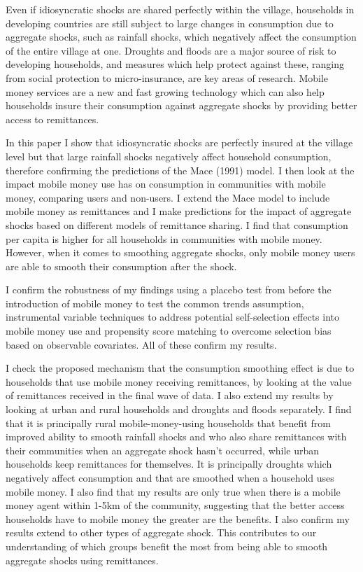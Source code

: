 Even if idiosyncratic shocks are shared perfectly within the village, households in developing countries are still subject to large changes in consumption due to aggregate shocks, such as rainfall shocks, which negatively affect the consumption of the entire village at one. Droughts and floods are a major source of risk to developing households, and measures which help protect against these, ranging from social protection to micro-insurance, are key areas of research. Mobile money services are a new and fast growing technology which can also help households insure their consumption against aggregate shocks by providing better access to remittances.

In this paper I show that idiosyncratic shocks are perfectly insured at the village level but that large rainfall shocks negatively affect household consumption, therefore confirming the predictions of the Mace (1991) model. I then look at the impact mobile money use has on consumption in communities with mobile money, comparing users and non-users. I extend the Mace model to include mobile money as remittances and I make predictions for the impact of aggregate shocks based on different models of remittance sharing. I find that consumption per capita is higher for all households in communities with mobile money. However, when it comes to smoothing aggregate shocks, only mobile money users are  able to smooth their consumption after the shock. 

I confirm the robustness of my findings using a placebo test from before the introduction of mobile money to test the common trends assumption, instrumental variable techniques to address potential self-selection effects into mobile money use and propensity score matching to overcome selection bias based on observable covariates. All of these confirm my results. 

I check the proposed mechanism that the consumption smoothing effect is due to households that use mobile money receiving remittances, by looking at the value of remittances received in the final wave of data. I also extend my results by looking at urban and rural households and droughts and floods separately. I find that it is principally rural mobile-money-using households that benefit from improved ability to smooth rainfall shocks and who also share remittances with their communities when an aggregate shock hasn't occurred, while urban households keep remittances for themselves. It is principally droughts which negatively affect consumption and that are smoothed when a household uses mobile money. I also find that my results are only true when there is a mobile money agent within 1-5km of the community, suggesting that the better access households have to mobile money the greater are the benefits. I also confirm my results extend to other types of aggregate shock. This contributes to our understanding of which groups benefit the most from being able to smooth aggregate shocks using remittances.   

